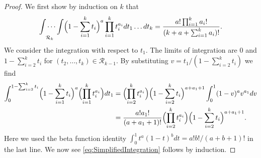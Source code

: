 \documentclass[12pt,a4paper]{amsart}
\theoremstyle{plain}
\numberwithin{sblmm}{thrm}
\numberwithin{equation}{section}
\begin{document}
\begin{proof}
We first show by induction on $k$ that
\begin{equation}
\idotsint\limits_{\mathcal{R}_k}\Bigl(1-\sum_{i=1}^kt_i\Bigr)^a\prod_{i=1}^kt_i^{a_i}dt_1\dotsc dt_k=\frac{a!\prod_{i=1}^ka_i!}{(k+a+\sum_{i=1}^ka_i)!}.\label{eq:SimplifiedIntegration}
\end{equation}
We consider the integration with respect to $t_1$. The limits of integration are $0$ and $1-\sum_{i=2}^kt_i$ for $(t_2,\dotsc,t_k)\in\mathcal{R}_{k-1}$. By substituting $v=t_1/(1-\sum_{i=2}^kt_i)$ we find
\begin{align}
\int_0^{1-\sum_{i=2}^kt_i}\Bigl(1-\sum_{i=1}^kt_i\Bigr)^a\Bigl(\prod_{i=1}^kt_i^{a_i}\Bigr)dt_1 &=\Bigl(\prod_{i=2}^kt_i^{a_i}\Bigr)\Bigl(1-\sum_{i=2}^kt_i\Bigr)^{a+a_1+1}\int_0^1(1-v)^av^{a_1}dv\nonumber\\
&=\frac{a!a_1!}{(a+a_1+1)!}\Bigl(\prod_{i=2}^kt_i^{a_i}\Bigr)\Bigl(1-\sum_{i=2}^kt_i\Bigr)^{a+a_1+1}.
\end{align}
Here we used the beta function identity $\int_0^1t^a(1-t)^bdt=a!b!/(a+b+1)!$ in the last line. We now see \eqref{eq:SimplifiedIntegration} follows by induction.


\end{proof}
\end{document}
